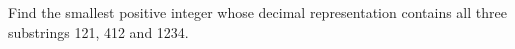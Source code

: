 Find the smallest positive integer whose decimal representation contains all three substrings 121, 412 and 1234.
